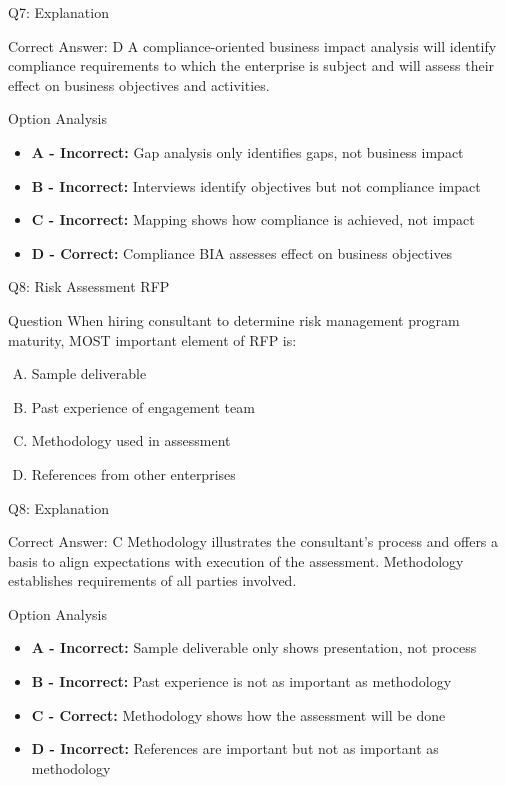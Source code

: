 \documentclass{beamer}
\begin{document}
	\begin{frame}{Q7: Explanation}
		\begin{block}{Correct Answer: D}
			A compliance-oriented business impact analysis will identify compliance requirements to which the enterprise is subject and will assess their effect on business objectives and activities.
		\end{block}
		\begin{block}{Option Analysis}
			\begin{itemize}
				\item \textbf{A - Incorrect:} Gap analysis only identifies gaps, not business impact
				\item \textbf{B - Incorrect:} Interviews identify objectives but not compliance impact
				\item \textbf{C - Incorrect:} Mapping shows how compliance is achieved, not impact
				\item \textbf{D - Correct:} Compliance BIA assesses effect on business objectives
			\end{itemize}
		\end{block}
	\end{frame}
	
	\begin{frame}{Q8: Risk Assessment RFP}
		\begin{block}{Question}
			When hiring consultant to determine risk management program maturity, MOST important element of RFP is:
		\end{block}
		\begin{enumerate}[(A)]
			\item Sample deliverable
			\item Past experience of engagement team
			\item Methodology used in assessment
			\item References from other enterprises
		\end{enumerate}
	\end{frame}
	
	\begin{frame}{Q8: Explanation}
		\begin{block}{Correct Answer: C}
			Methodology illustrates the consultant's process and offers a basis to align expectations with execution of the assessment. Methodology establishes requirements of all parties involved.
		\end{block}
		\begin{block}{Option Analysis}
			\begin{itemize}
				\item \textbf{A - Incorrect:} Sample deliverable only shows presentation, not process
				\item \textbf{B - Incorrect:} Past experience is not as important as methodology
				\item \textbf{C - Correct:} Methodology shows how the assessment will be done
				\item \textbf{D - Incorrect:} References are important but not as important as methodology
			\end{itemize}
		\end{block}
	\end{frame}
	
\end{document}
